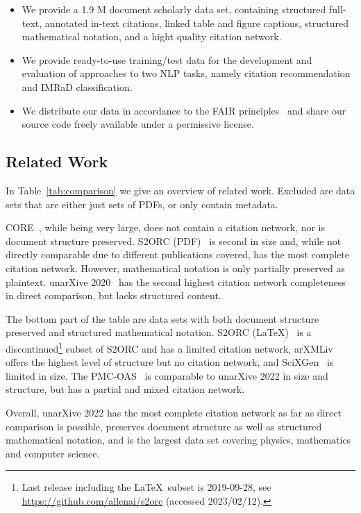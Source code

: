 
\begin{itemize}
    \item We provide a 1.9 M document scholarly data set, containing structured full-text, annotated in-text citations, linked table and figure captions, structured mathematical notation, and a hight quality citation network.
    \item We provide ready-to-use training/test data for the development and evaluation of approaches to two NLP tasks, namely citation recommendation and IMRaD classification.
    \item We distribute our data in accordance to the FAIR principles~\cite{Wilkinson2016} and share our source code freely available under a permissive license.
\end{itemize}

\subsection{Related Work}

In Table~\ref{tab:comparison} we give an overview of related work.
Excluded are data sets that are either just sets of PDFs, or only contain metadata.

CORE~\cite{core}, while being very large, does not contain a citation network, nor is document structure preserved.
S2ORC (PDF)~\cite{Lo2020} is second in size and, while not directly comparable due to different publications covered, has the most complete citation network. However, mathematical notation is only partially preserved as plaintext.
unarXive 2020~\cite{Saier2020} has the second highest citation network completeness in direct comparison, but lacks structured content.

The bottom part of the table are data sets with both document structure preserved and structured mathematical notation.
S2ORC (\LaTeX)~\cite{Lo2020} is a discontinued\footnote{Last release including the \LaTeX\ subset is 2019-09-28, see \url{https://github.com/allenai/s2orc} (accessed 2023/02/12).} subset of S2ORC and has a limited citation network, 
arXMLiv~\cite{arXMLiv} offers the highest level of structure but no citation network, and 
SciXGen~\cite{chen2021-scixgen} is limited in size.
The PMC-OAS~\cite{pmc_oas} is comparable to unarXive 2022 in size and structure, but has a partial and mixed citation network.

Overall, unarXive 2022 has the most complete citation network as far as direct comparison is possible, preserves document structure as well as structured mathematical notation, and is the largest data set covering physics, mathematics and computer science.

